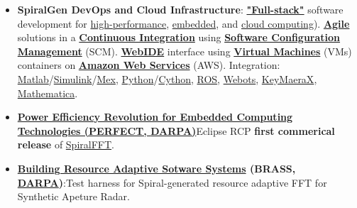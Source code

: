 \documentclass{article}
\begin{document}
\begin{itemize}
\begin{itemize}
    \item \textbf{SpiralGen DevOps and Cloud Infrastructure}: \textbf{\href{https://www.google.com/search?q=full+stack+software&oq=full+stack+software&aqs=chrome..69i57.2623j0j7&sourceid=chrome&es_sm=122&ie=UTF-8}{"Full-stack"}} software development for \href{https://en.wikipedia.org/wiki/Supercomputer}{high-performance}, \href{https://en.wikipedia.org/wiki/Embedded_system}{embedded}, and \href{https://en.wikipedia.org/wiki/Cloud_computing}{cloud computing}). \textbf{\href{https://en.wikipedia.org/wiki/Agile_software_development}{Agile}} solutions in a \textbf{\href{http://en.wikipedia.org/wiki/Continuous_integration}{Continuous Integration}} using \textbf{\href{https://en.wikipedia.org/wiki/Software_configuration_management}{Software Configuration Management}} (SCM). \textbf{\href{https://dzone.com/articles/who-needs-online-ide}{WebIDE}} interface using \textbf{\href{https://en.wikipedia.org/wiki/Virtual_machine}{Virtual Machines}} (VMs) containers on \textbf{\href{https://en.wikipedia.org/wiki/Amazon_Web_Services}{Amazon Web Services}} (AWS).  Integration: \href{http://www.mathworks.com/products/matlab/}{Matlab}/\href{http://www.mathworks.com/products/simulink/}{Simulink}/\href{http://www.mathworks.com/help/matlab/ref/mex.html}{Mex}, \href{https://www.python.org/}{Python}/\href{http://cython.org/}{Cython}, \href{http://www.ros.org/}{ROS}, \href{https://www.cyberbotics.com/overview}{Webots}, \href{http://www.ls.cs.cmu.edu/KeYmaeraX/}{KeyMaeraX}, \href{http://www.wolfram.com/mathematica/}{Mathematica}.


    \item \textbf{\href{http://www.darpa.mil/Our_Work/MTO/Programs/Power_Efficiency_Revolution_for_Embedded_Computing_Technologies_(PERFECT).aspx}{Power Efficiency Revolution for Embedded Computing Technologies (PERFECT, \href{http://www.darpa.mil/default.aspx}{DARPA})}}Eclipse RCP \textbf{first commerical release} of \href{http://www.spiralgen.com/new-products/spiral-fft-gpl-10}{SpiralFFT}.  

    \item \textbf{\href{http://www.darpa.mil/program/building-resource-adaptive-software-systems}{Building Resource Adaptive Sotware Systems} (BRASS, \href{http://www.darpa.mil/default.aspx}{DARPA})}:Test harness for Spiral-generated resource adaptive FFT for Synthetic Apeture Radar. 

  \end{itemize}


\end{itemize}
\end{document}
